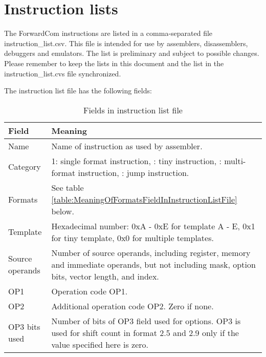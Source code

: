 \documentclass[forwardcom.tex]{subfiles}
\begin{document}
\RaggedRight

\chapter{Instruction lists}
The ForwardCom instructions are listed in a comma-separated file instruction\_list.csv. This file is intended for use by assemblers, disassemblers, debuggers and emulators. The list is preliminary and subject to possible changes. Please remember to keep the lists in this document and the list in the instruction\_list.cvs file synchronized.
\vspace{2mm}

The instruction list file has the following fields:

\begin{longtable} {|p{18mm}|p{100mm}|}
\caption{Fields in instruction list file} 
\label{table:fieldsInInstructionListFile}
\\
\endfirsthead
\endhead
\hline
\bfseries Field & \bfseries Meaning  \\
\hline
Name & Name of instruction as used by assembler.  \\
\hline
Category & 1: single format instruction, \newline
           2: tiny instruction,  \newline
           3: multi-format instruction,  \newline
           4: jump instruction. \\
\hline
Formats & See table \ref{table:MeaningOfFormatsFieldInInstructionListFile} below.  \\
\hline
Template & Hexadecimal number:  \newline
           0xA - 0xE for template A - E,  \newline
           0x1 for tiny template,  \newline
           0x0 for multiple templates. \\
\hline
Source operands & Number of source operands, including register, memory and immediate operands, but not including mask, option bits, vector length, and index. \\
\hline
OP1 & Operation code OP1. \\
\hline
OP2 & Additional operation code OP2. Zero if none. \\
\hline
OP3 bits used & Number of bits of OP3 field used for options. OP3 is used for shift count in format 2.5 and 2.9 only if the value specified here is zero. \\

\end{longtable}
\end{document}
